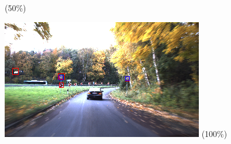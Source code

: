 \documentclass[12pt,a4paper,bibliography=totocnumbered,listof=totocnumbered]{scrartcl}
\begin{document}
\begin{figure}[H]
\begin{minipage}{0.3\textwidth}
\small{(50\%)}
\end{minipage}
\hfill
\begin{minipage}{0.3\textwidth}
\centering
\includegraphics[width=\linewidth]{test44_wb_predboxes2.png}
\small{(100\%)}
\end{minipage}


\end{figure}
\end{document}
